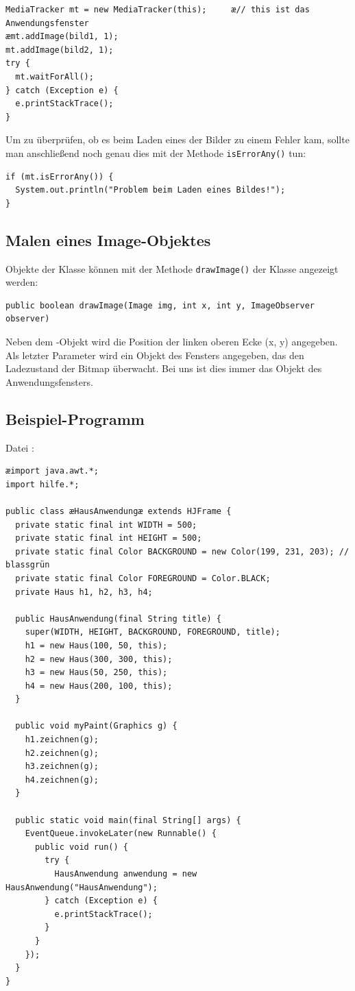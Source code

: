\begin{lstlisting}
MediaTracker mt = new MediaTracker(this);     æ// this ist das Anwendungsfenster
æmt.addImage(bild1, 1);
mt.addImage(bild2, 1);
try {
  mt.waitForAll();
} catch (Exception e) {
  e.printStackTrace();
}
\end{lstlisting}

Um zu überprüfen, ob es beim Laden eines der Bilder zu einem Fehler kam, sollte
man anschließend noch genau dies mit der Methode \lstinline|isErrorAny()| tun:

\begin{lstlisting}
if (mt.isErrorAny()) {
  System.out.println("Problem beim Laden eines Bildes!");
}
\end{lstlisting}


\subsection{Malen eines Image-Objektes}

Objekte der Klasse  können mit der Methode
\lstinline|drawImage()| der Klasse  angezeigt werden:

\begin{lstlisting}
public boolean drawImage(Image img, int x, int y, ImageObserver observer)
\end{lstlisting}

Neben dem -Objekt wird die Position der linken oberen Ecke (x, y)
angegeben. Als letzter Parameter wird ein Objekt des Fensters angegeben, das
den Ladezustand der Bitmap überwacht. Bei uns ist dies immer das Objekt des
Anwendungsfensters.


\subsection{Beispiel-Programm}

Datei :

\begin{lstlisting}
æimport java.awt.*;
import hilfe.*;

public class æHausAnwendungæ extends HJFrame {
  private static final int WIDTH = 500;
  private static final int HEIGHT = 500;
  private static final Color BACKGROUND = new Color(199, 231, 203); // blassgrün
  private static final Color FOREGROUND = Color.BLACK;
  private Haus h1, h2, h3, h4;

  public HausAnwendung(final String title) {
    super(WIDTH, HEIGHT, BACKGROUND, FOREGROUND, title);
    h1 = new Haus(100, 50, this);
    h2 = new Haus(300, 300, this);
    h3 = new Haus(50, 250, this);
    h4 = new Haus(200, 100, this);
  }
  
  public void myPaint(Graphics g) {
    h1.zeichnen(g);
    h2.zeichnen(g);
    h3.zeichnen(g);
    h4.zeichnen(g);
  }

  public static void main(final String[] args) {
    EventQueue.invokeLater(new Runnable() {
      public void run() {
        try {
          HausAnwendung anwendung = new HausAnwendung("HausAnwendung");
        } catch (Exception e) {
          e.printStackTrace();
        }
      }
    });
  }
}
\end{lstlisting}

